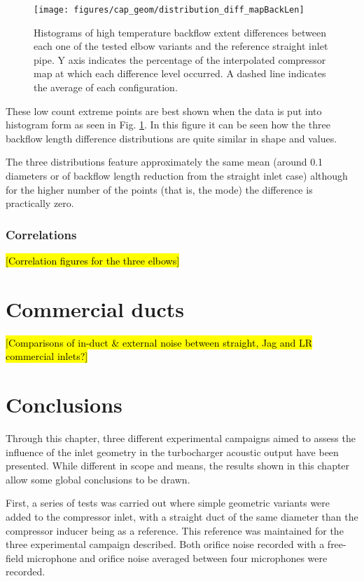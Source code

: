 \begin{figure}[h!]
\centering
\texttt{[image: figures/cap\_geom/distribution\_diff\_mapBackLen]}
\caption{Histograms of high temperature backflow extent differences between each one of the tested elbow variants and the reference straight inlet pipe. Y axis indicates the percentage of the interpolated compressor map at which each difference level occurred. A dashed line indicates the average of each configuration.}
\label{fig:distribution_diff_backL}
\end{figure}

These low count extreme points are best shown when the data is put into histogram form as seen in Fig. \ref{fig:distribution_diff_backL}. In this figure it can be seen how the three backflow length difference distributions are quite similar in shape and values.

The three distributions feature approximately the same mean (around 0.1 diameters or of backflow length reduction from the straight inlet case) although for the higher number of the points (that is, the mode) the difference is practically zero.

\subsubsection{Correlations}

\hl{[Correlation figures for the three elbows]}

\section{Commercial ducts}

\hl{[Comparisons of in-duct \& external noise between straight, Jag and LR commercial inlets?]}

\section{Conclusions}

Through this chapter, three different experimental campaigns aimed to assess the influence of the inlet geometry in the turbocharger acoustic output have been presented. While different in scope and means, the results shown in this chapter allow some global conclusions to be drawn.

First, a series of tests was carried out where simple geometric variants were added to the compressor inlet, with a straight duct of the same diameter than the compressor inducer being as a reference. This reference was maintained for the three experimental campaign described. Both orifice noise recorded with a free-field microphone and orifice noise averaged between four microphones were recorded.


